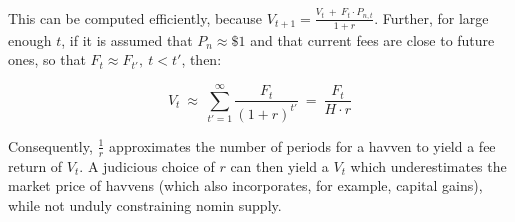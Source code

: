 \noindent This can be computed efficiently, because \(V_{t+1} = \frac{V_t \ + \ F_t \cdot P_{n,t}}{1 + r}\). 
Further, for large enough \(t\), if it is assumed that \(P_n \approx \$1\) and that current fees are close to
future ones, so that \(F_t \approx F_{t'}, \ t < t'\), then:

\vspace{2mm}

\begin{equation} 
    V_t \ \approx \ \sum_{t'=1}^{\infty} \frac{F_t}{{(1 + r)}^{t'}} \ = \ \frac{F_t}{H \cdot r} \label{eq:havvenvalue}
\end{equation}

\vspace{3mm}

\noindent Consequently, \(\frac{1}{r}\) approximates the number of periods for
a havven to yield a fee return of \(V_t\). A judicious choice of \(r\) can then
yield a \(V_t\) which underestimates the market price of havvens (which also
incorporates, for example, capital gains), while not unduly constraining
nomin supply.
